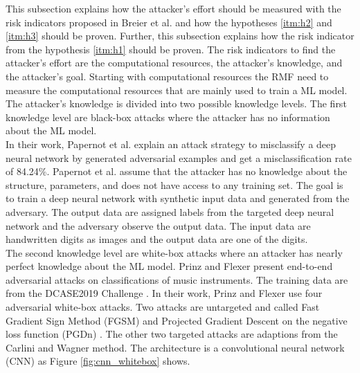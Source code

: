 This subsection explains how the attacker's effort should be measured with the risk indicators proposed in Breier et al. \cite{DBLP:journals/corr/abs-2012-04884} and how the hypotheses \ref{itm:h2} and
\ref{itm:h3} should be proven. Further, this subsection explains how the risk indicator from the hypothesis \ref{itm:h1} should be proven. The risk indicators to find the attacker's effort are the
computational resources, the attacker's knowledge, and the attacker's goal. Starting with computational resources the RMF need to measure the computational resources that are mainly used to train a ML
model. The attacker's knowledge is divided into two possible knowledge levels. The first knowledge level are black-box attacks where the attacker has no information about the ML model. \\ In their
work, Papernot et al. \cite{DBLP:conf/ccs/PapernotMGJCS17} explain an attack strategy to misclassify a deep neural network by generated adversarial examples and get a misclassification rate of 84.24\%.
Papernot et al. assume that the attacker has no knowledge about the structure, parameters, and does not have access to any training set. The goal is to train a deep neural network with synthetic input
data and generated from the adversary. The output data are assigned labels from the targeted deep neural network and the adversary observe the output data. The input data are handwritten digits as
images and the output data are one of the digits. \\ The second knowledge level are white-box attacks where an attacker has nearly perfect knowledge about the ML model. Prinz and Flexer
\cite{DBLP:journals/corr/abs-2007-14714} present end-to-end adversarial attacks on classifications of music instruments. The training data are from the DCASE2019 Challenge \cite{DBLP:conf/dcase/
FonsecaPFES19}. In their work, Prinz and Flexer use four adversarial white-box attacks. Two attacks are untargeted
and called Fast Gradient Sign Method (FGSM) \cite{DBLP:journals/corr/GoodfellowSS14} and Projected Gradient Descent on the negative loss function (PGDn) \cite{DBLP:conf/iclr/MadryMSTV18}. The other two
targeted attacks are adaptions from the  Carlini and Wagner \cite{DBLP:conf/sp/Carlini018} method. The architecture is a convolutional neural network (CNN) as Figure \ref{fig:cnn_whitebox} shows.

